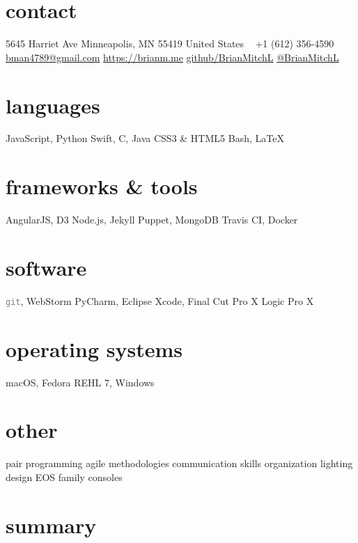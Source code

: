 \documentclass[]{cv-style} %
\begin{document}
\lastupdated


\begin{aside} %
\section{contact}
5645 Harriet Ave
Minneapolis, MN 55419
United States
~
+1 (612) 356-4590
~
\href{mailto:bman4789@gmail.com}{bman4789@gmail.com}
\href{https://brianm.me}{https://brianm.me}
\href{https://github.com/BrianMitchL}{\textcolor{darkgray}{ }github/BrianMitchL}
\href{https://twitter.com/BrianMitchL}{\textcolor{twitter}{ }@BrianMitchL}
\section{languages}
JavaScript, Python
Swift, C, Java
CSS3 \& HTML5
Bash, \LaTeX
\section{frameworks \& tools}
AngularJS, D3
Node.js, Jekyll
Puppet, MongoDB
Travis CI, Docker
\section{software}
\textcolor{gray}{\texttt{git}}, WebStorm
PyCharm, Eclipse
Xcode, Final Cut Pro X
Logic Pro X
\section{operating systems}
macOS, Fedora
REHL 7, Windows
\section{other}
pair programming
agile methodologies
communication skills
organization
lighting design
EOS family consoles
\end{aside}

\vspace{0.2cm}
\section{summary}
\end{document}
